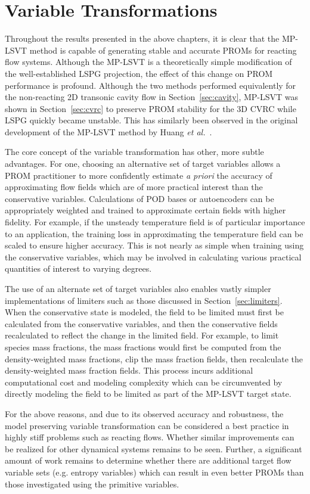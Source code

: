 \section{Variable Transformations}

Throughout the results presented in the above chapters, it is clear that the MP-LSVT method is capable of generating stable and accurate PROMs for reacting flow systems. Although the MP-LSVT is a theoretically simple modification of the well-established LSPG projection, the effect of this change on PROM performance is profound. Although the two methods performed equivalently for the non-reacting 2D transonic cavity flow in Section~\ref{sec:cavity}, MP-LSVT was shown in Section~\ref{sec:cvrc} to preserve PROM stability for the 3D CVRC while LSPG quickly became unstable. This has similarly been observed in the original development of the MP-LSVT method by Huang \textit{et al.}~\cite{Huang2022}.

The core concept of the variable transformation has other, more subtle advantages. For one, choosing an alternative set of target variables allows a PROM practitioner to more confidently estimate \textit{a priori} the accuracy of approximating flow fields which are of more practical interest than the conservative variables. Calculations of POD bases or autoencoders can be appropriately weighted and trained to approximate certain fields with higher fidelity. For example, if the unsteady temperature field is of particular importance to an application, the training loss in approximating the temperature field can be scaled to ensure higher accuracy. This is not nearly as simple when training using the conservative variables, which may be involved in calculating various practical quantities of interest to varying degrees.   

The use of an alternate set of target variables also enables vastly simpler implementations of limiters such as those discussed in Section~\ref{sec:limiters}. When the conservative state is modeled, the field to be limited must first be calculated from the conservative variables, and then the conservative fields recalculated to reflect the change in the limited field. For example, to limit species mass fractions, the mass fractions would first be computed from the density-weighted mass fractions, clip the mass fraction fields, then recalculate the density-weighted mass fraction fields. This process incurs additional computational cost and modeling complexity which can be circumvented by directly modeling the field to be limited as part of the MP-LSVT target state.

For the above reasons, and due to its observed accuracy and robustness, the model preserving variable transformation  can be considered a best practice in highly stiff problems such as reacting flows. Whether similar improvements can be realized for other dynamical systems remains to be seen. Further, a significant amount of work remains to determine whether there are additional target flow variable sets (e.g. entropy variables) which can result in even better PROMs than those investigated using the primitive variables.